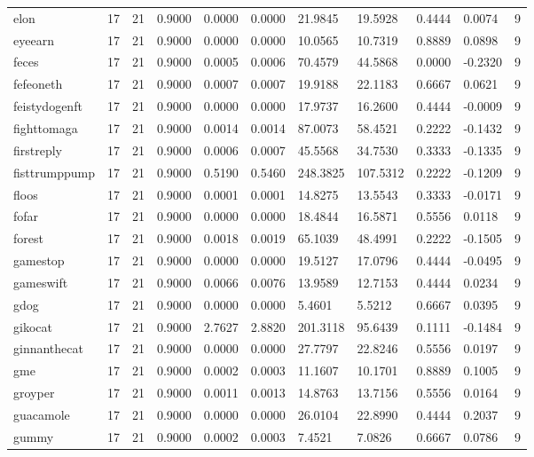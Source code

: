 \begin{table}[htbp]
\begin{tabular}{lllllllllll}
elon & 17 & 21 & 0.9000 & 0.0000 & 0.0000 & 21.9845 & 19.5928 & 0.4444 & 0.0074 & 9 \\
eyeearn & 17 & 21 & 0.9000 & 0.0000 & 0.0000 & 10.0565 & 10.7319 & 0.8889 & 0.0898 & 9 \\
feces & 17 & 21 & 0.9000 & 0.0005 & 0.0006 & 70.4579 & 44.5868 & 0.0000 & -0.2320 & 9 \\
fefeoneth & 17 & 21 & 0.9000 & 0.0007 & 0.0007 & 19.9188 & 22.1183 & 0.6667 & 0.0621 & 9 \\
feistydogenft & 17 & 21 & 0.9000 & 0.0000 & 0.0000 & 17.9737 & 16.2600 & 0.4444 & -0.0009 & 9 \\
fighttomaga & 17 & 21 & 0.9000 & 0.0014 & 0.0014 & 87.0073 & 58.4521 & 0.2222 & -0.1432 & 9 \\
firstreply & 17 & 21 & 0.9000 & 0.0006 & 0.0007 & 45.5568 & 34.7530 & 0.3333 & -0.1335 & 9 \\
fisttrumppump & 17 & 21 & 0.9000 & 0.5190 & 0.5460 & 248.3825 & 107.5312 & 0.2222 & -0.1209 & 9 \\
floos & 17 & 21 & 0.9000 & 0.0001 & 0.0001 & 14.8275 & 13.5543 & 0.3333 & -0.0171 & 9 \\
fofar & 17 & 21 & 0.9000 & 0.0000 & 0.0000 & 18.4844 & 16.5871 & 0.5556 & 0.0118 & 9 \\
forest & 17 & 21 & 0.9000 & 0.0018 & 0.0019 & 65.1039 & 48.4991 & 0.2222 & -0.1505 & 9 \\
gamestop & 17 & 21 & 0.9000 & 0.0000 & 0.0000 & 19.5127 & 17.0796 & 0.4444 & -0.0495 & 9 \\
gameswift & 17 & 21 & 0.9000 & 0.0066 & 0.0076 & 13.9589 & 12.7153 & 0.4444 & 0.0234 & 9 \\
gdog & 17 & 21 & 0.9000 & 0.0000 & 0.0000 & 5.4601 & 5.5212 & 0.6667 & 0.0395 & 9 \\
gikocat & 17 & 21 & 0.9000 & 2.7627 & 2.8820 & 201.3118 & 95.6439 & 0.1111 & -0.1484 & 9 \\
ginnanthecat & 17 & 21 & 0.9000 & 0.0000 & 0.0000 & 27.7797 & 22.8246 & 0.5556 & 0.0197 & 9 \\
gme & 17 & 21 & 0.9000 & 0.0002 & 0.0003 & 11.1607 & 10.1701 & 0.8889 & 0.1005 & 9 \\
groyper & 17 & 21 & 0.9000 & 0.0011 & 0.0013 & 14.8763 & 13.7156 & 0.5556 & 0.0164 & 9 \\
guacamole & 17 & 21 & 0.9000 & 0.0000 & 0.0000 & 26.0104 & 22.8990 & 0.4444 & 0.2037 & 9 \\
gummy & 17 & 21 & 0.9000 & 0.0002 & 0.0003 & 7.4521 & 7.0826 & 0.6667 & 0.0786 & 9 \\

\end{tabular}
\end{table}
